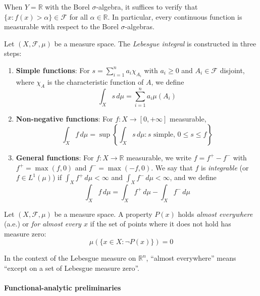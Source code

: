 When $Y = \mathbb{R}$ with the Borel $\sigma$-algebra, it suffices to verify that $\{x : f(x) > \alpha\} \in \mathcal{F}$ for all $\alpha \in \mathbb{R}$. In particular, every continuous function is measurable with respect to the Borel $\sigma$-algebras.

\begin{definition}\label{def:integral_lebesgue}
	Let $(X, \mathcal{F}, \mu)$ be a measure space. The \textit{Lebesgue integral} is constructed in three steps:
	\begin{enumerate}
		\item \textbf{Simple functions}: For $s = \sum_{i=1}^n a_i \chi_{A_i}$ with $a_i \geq 0$ and $A_i \in \mathcal{F}$ disjoint, where $\chi_{A}$ is the characteristic function of $A$, we define
		\[
			\int_X s \, d\mu = \sum_{i=1}^n a_i \mu(A_i)
		\]
		\item \textbf{Non-negative functions}: For $f: X \to [0, +\infty]$ measurable,
		\[
			\int_X f \, d\mu = \sup\left\{\int_X s \, d\mu : s \text{ simple, } 0 \leq s \leq f\right\}
		\]
		\item \textbf{General functions}: For $f: X \to \mathbb{R}$ measurable, we write $f = f^+ - f^-$ with $f^+ = \max(f, 0)$ and $f^- = \max(-f, 0)$. We say that $f$ is \textit{integrable} (or $f \in L^1(\mu)$) if $\int_X f^+ \, d\mu < \infty$ and $\int_X f^- \, d\mu < \infty$, and we define
		\[
			\int_X f \, d\mu = \int_X f^+ \, d\mu - \int_X f^- \, d\mu
		\]
	\end{enumerate}
\end{definition}

\begin{definition}\label{def:casi_por_doquier}
	Let $(X, \mathcal{F}, \mu)$ be a measure space. A property $P(x)$ holds \textit{almost everywhere} (a.e.) or \textit{for almost every $x$} if the set of points where it does not hold has measure zero:
	\[
		\mu(\{x \in X : \neg P(x)\}) = 0
	\]
\end{definition}

In the context of the Lebesgue measure on $\mathbb{R}^n$, ``almost everywhere'' means ``except on a set of Lebesgue measure zero''.

\paragraph{Functional-analytic preliminaries}

